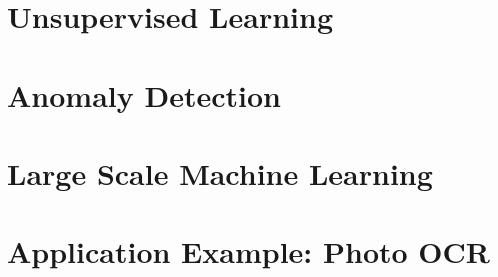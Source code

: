 \documentclass{article}
\begin{document}
    \section{Unsupervised Learning}



    \section{Anomaly Detection}



    \section{Large Scale Machine Learning}



    \section{Application Example: Photo OCR}
\end{document}

